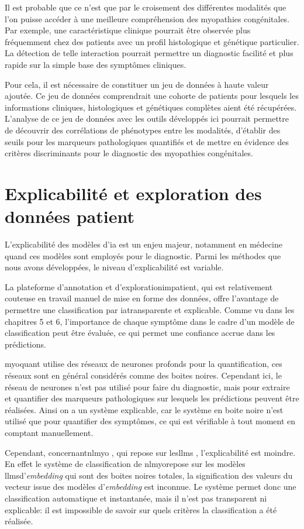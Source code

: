 Il est probable que ce n'est que par le croisement des différentes modalités que l'on puisse accéder à une meilleure compréhension des myopathies congénitales. Par exemple, une caractéristique clinique pourrait être observée plus fréquemment chez des patients avec un profil histologique et génétique particulier. La détection de telle interaction pourrait permettre un diagnostic facilité et plus rapide sur la simple base des symptômes cliniques.

Pour cela, il est nécessaire de constituer un jeu de données à haute valeur ajoutée. Ce jeu de données comprendrait une cohorte de patients pour lesquels les informations cliniques, histologiques et génétiques complètes aient été récupérées. L'analyse de ce jeu de données avec les outils développés ici pourrait permettre de découvrir des corrélations de phénotypes entre les modalités, d'établir des seuils pour les marqueurs pathologiques quantifiés et de mettre en évidence des critères discriminants pour le diagnostic des myopathies congénitales.

\section{Explicabilité et exploration des données patient}
L'explicabilité des modèles d'\gls{ia} est un enjeu majeur, notamment en médecine quand ces modèles sont employés pour le diagnostic. Parmi les méthodes que nous avons développées, le niveau d'explicabilité est variable.

La plateforme d'annotation et d'exploration\gls{impatient}, qui est relativement couteuse en travail manuel de mise en forme des données, offre l'avantage de permettre une classification par  \gls{ia}transparente et explicable. Comme vu dans les chapitres 5 et 6, l'importance de chaque symptôme dans le cadre d'un modèle de classification peut être évaluée, ce qui permet une confiance accrue dans les prédictions.

\gls{myoquant} utilise des réseaux de neurones profonds pour la quantification, ces réseaux sont en général considérés comme des boites noires. Cependant ici, le réseau de neurones n'est pas utilisé pour faire du diagnostic, mais pour extraire et quantifier des marqueurs pathologiques sur lesquels les prédictions peuvent être réalisées. Ainsi on a un système explicable, car le système en boite noire n'est utilisé que pour quantifier des symptômes, ce qui est vérifiable à tout moment en comptant manuellement.

Cependant, concernant\gls{nlmyo} , qui repose sur les\gls{llms} , l'explicabilité est moindre. En effet le système de classification de  \gls{nlmyo}repose sur les modèles  \gls{llms}d'\textit{embedding} qui sont des boites noires totales, la signification des valeurs du vecteur issue des modèles d'\textit{embedding} est inconnue. Le système permet donc une classification automatique et instantanée, mais il n'est pas transparent ni explicable: il est impossible de savoir sur quels critères la classification a été réalisée.

